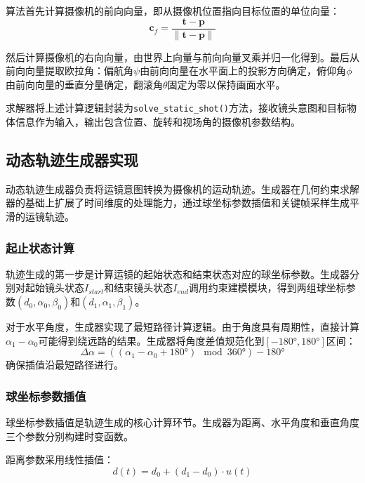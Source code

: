 算法首先计算摄像机的前向向量，即从摄像机位置指向目标位置的单位向量：
\begin{equation}
\mathbf{c}_f = \frac{\mathbf{t} - \mathbf{p}}{\|\mathbf{t} - \mathbf{p}\|}
\end{equation}

然后计算摄像机的右向向量，由世界上向量与前向向量叉乘并归一化得到。最后从前向向量提取欧拉角：偏航角$\psi$由前向向量在水平面上的投影方向确定，俯仰角$\phi$由前向向量的垂直分量确定，翻滚角$\theta$固定为零以保持画面水平。

求解器将上述计算逻辑封装为\texttt{solve\_static\_shot()}方法，接收镜头意图和目标物体信息作为输入，输出包含位置、旋转和视场角的摄像机参数结构。

\subsection{动态轨迹生成器实现}

动态轨迹生成器负责将运镜意图转换为摄像机的运动轨迹。生成器在几何约束求解器的基础上扩展了时间维度的处理能力，通过球坐标参数插值和关键帧采样生成平滑的运镜轨迹。

\subsubsection{起止状态计算}

轨迹生成的第一步是计算运镜的起始状态和结束状态对应的球坐标参数。生成器分别对起始镜头状态$I_{start}$和结束镜头状态$I_{end}$调用约束建模模块，得到两组球坐标参数$(d_0, \alpha_0, \beta_0)$和$(d_1, \alpha_1, \beta_1)$。

对于水平角度，生成器实现了最短路径计算逻辑。由于角度具有周期性，直接计算$\alpha_1 - \alpha_0$可能得到绕远路的结果。生成器将角度差值规范化到$[-180°, 180°]$区间：
\begin{equation}
\Delta\alpha = ((\alpha_1 - \alpha_0 + 180°) \mod 360°) - 180°
\end{equation}
确保插值沿最短路径进行。

\subsubsection{球坐标参数插值}

球坐标参数插值是轨迹生成的核心计算环节。生成器为距离、水平角度和垂直角度三个参数分别构建时变函数。

距离参数采用线性插值：
\begin{equation}
d(t) = d_0 + (d_1 - d_0) \cdot u(t)
\end{equation}

